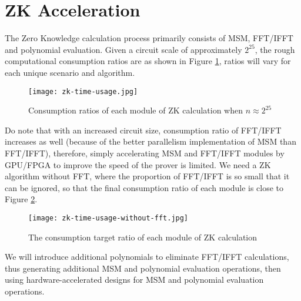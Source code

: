 \section{ZK Acceleration} \label{sec:zk-acceleration}

The Zero Knowledge calculation process primarily consists of MSM, FFT/IFFT and polynomial evaluation. Given a circuit scale of approximately $2^{25}$, the rough computational consumption ratios are as shown in Figure \ref{fig:time-usage-origin}, ratios will vary for each unique scenario and algorithm.
\begin{figure}[!ht]
    \centering
    \texttt{[image: zk-time-usage.jpg]}
    \caption{Consumption ratios of each module of ZK calculation when $n \approx 2^{25}$}
    \label{fig:time-usage-origin}
\end{figure}

Do note that with an increased circuit size, consumption ratio of FFT/IFFT increases as well (because of the better parallelism implementation of MSM than FFT/IFFT), therefore, simply accelerating MSM and FFT/IFFT modules by GPU/FPGA to improve the speed of the prover is limited. We need a ZK algorithm without FFT, where the proportion of FFT/IFFT is so small that it can be ignored, so that the final consumption ratio of each module is close to Figure \ref{fig:time-usage-without-fft}.
\begin{figure}[!ht]
    \centering
    \texttt{[image: zk-time-usage-without-fft.jpg]}
    \caption{The consumption target ratio of each module of ZK calculation}
    \label{fig:time-usage-without-fft}
\end{figure}

We will introduce additional polynomials to eliminate FFT/IFFT calculations, thus generating additional MSM and polynomial evaluation operations, then using hardware-accelerated designs for MSM and polynomial evaluation operations.



